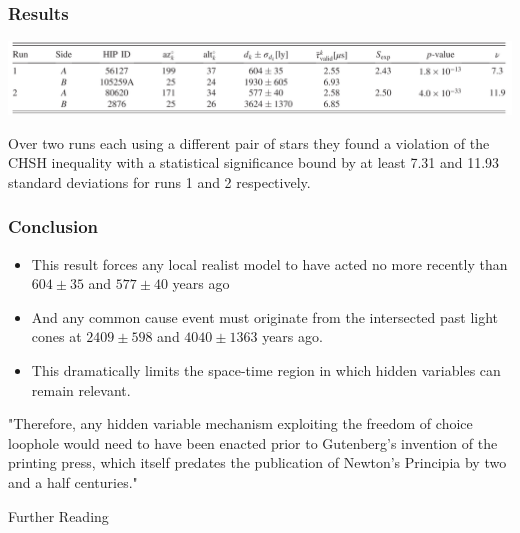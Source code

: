 \documentclass{beamer}
\begin{document}
\begin{frame}\frametitle{Results}
    \begin{center}
    \includegraphics[width=1.0\textwidth]{Images/Results_Table.png}

    \cite{Handsteiner2016}
    \end{center}

    Over two runs each using a different pair of stars they found a violation of the CHSH inequality with a 
    statistical significance bound by at least 7.31 and 11.93 standard deviations for runs 1 and 2 respectively.
\end{frame}

\begin{frame}\frametitle{Conclusion}
    \begin{itemize}
        \item This result forces any local realist model to have acted no more recently
            than $604\pm35$ and $577\pm40$ years ago
        \item And any common cause event must originate from the intersected past light cones at $2409\pm598$ and
            $4040\pm1363$ years ago.
        \item This dramatically limits the space-time region in which hidden variables can remain relevant.
    \end{itemize}
    \begin{block}{}
        "Therefore, any hidden variable mechanism exploiting the freedom of choice loophole would need to have 
        been enacted prior to Gutenberg's invention of the printing press, which itself predates the publication of 
        Newton's Principia by two and a half centuries." \cite{Handsteiner2016}
    \end{block}
\end{frame}

\begin{frame}{Further Reading}
    \tiny
    
    
\end{frame}
\end{document}
